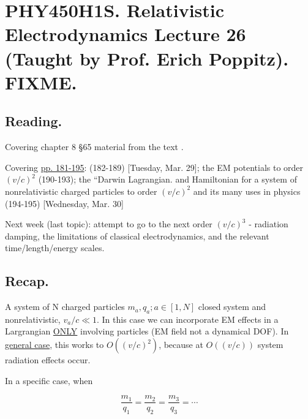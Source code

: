 
%

\chapter{PHY450H1S.  Relativistic Electrodynamics Lecture 26 (Taught by Prof. Erich Poppitz).  FIXME.}
\label{chap:relativisticElectrodynamicsL26}
{}
\date{April 5, 2011}

\beginArtNoToc

\section{Reading.}

Covering chapter 8 \S 65 material from the text \cite{landau1980classical}.

Covering \href{http://www.physics.utoronto.ca/~poppitz/epoppitz/PHY450_files/RelEMpp181-195.pdf}{pp. 181-195}: (182-189) [Tuesday, Mar. 29]; the EM potentials to order $(v/c)^2$ (190-193); the ``Darwin Lagrangian.  and Hamiltonian for a system of nonrelativistic charged particles to order $(v/c)^2$ and its many uses in physics (194-195) [Wednesday, Mar. 30]

Next week (last topic): attempt to go to the next order $(v/c)^3$ - radiation damping, the limitations of classical electrodynamics, and the relevant time/length/energy scales.

\section{Recap.}

A system of N charged particles $m_a, q_a ; a \in [1, N]$ closed system and nonrelativistic, $v_a/c \ll 1$.  In this case we can incorporate EM effects in a Largrangian \underline{ONLY} involving particles (EM field not a dynamical DOF).  In \underline{general case}, this works to $O((v/c)^2)$, because at $O((v/c))$ system radiation effects occur.

In a specific case, when
 
\begin{equation}\label{eqn:relativisticElectrodynamicsL26:n}
\frac{m_1}{q_1} = \frac{m_2}{q_2} = \frac{m_3}{q_3} = \cdots
\end{equation}

